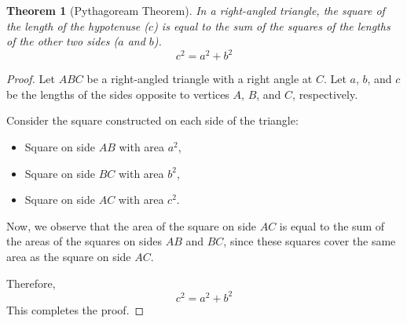 \documentclass{article}
\newtheorem{theorem}{Theorem}
\begin{document}
\begin{theorem}[Pythagoream Theorem]
    In a right-angled triangle, the square of the length of the hypotenuse ($c$) is equal to the sum of the squares of the lengths of the other two sides ($a$ and $b$).
    \[ c^2 = a^2 + b^2 \]
\end{theorem}

\begin{proof}
    Let $ABC$ be a right-angled triangle with a right angle at $C$. Let $a$, $b$, and $c$ be the lengths of the sides opposite to vertices $A$, $B$, and $C$, respectively.

    Consider the square constructed on each side of the triangle:

    \begin{itemize}
        \item Square on side $AB$ with area $a^2$,
        \item Square on side $BC$ with area $b^2$,
        \item Square on side $AC$ with area $c^2$.
    \end{itemize}

    Now, we observe that the area of the square on side $AC$ is equal to the sum of the areas of the squares on sides $AB$ and $BC$, since these squares cover the same area as the square on side $AC$.

    Therefore,
    \[ c^2 = a^2 + b^2 \]
    This completes the proof.
\end{proof}
\end{document}
